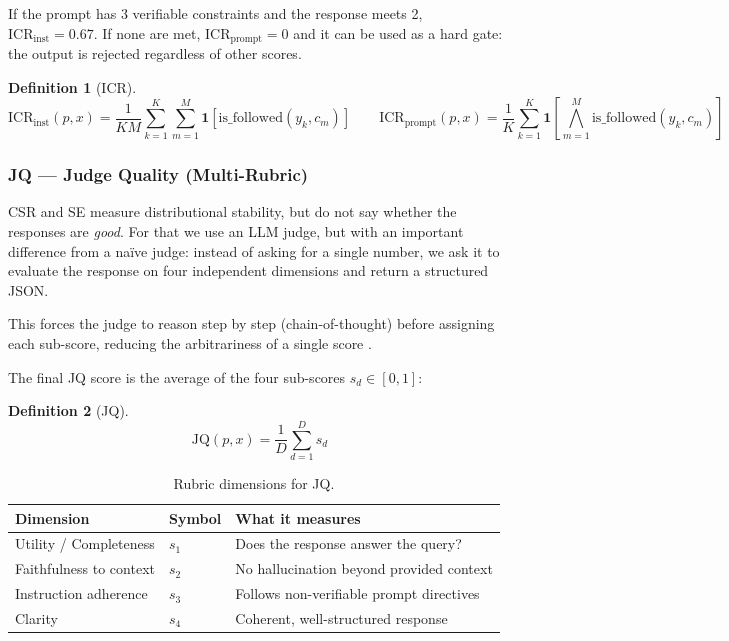 \documentclass[11pt,a4paper]{article}
\newtheorem{definition}{Definition}
\begin{document}
If the prompt has 3 verifiable constraints and the response meets 2, $\mathrm{ICR}_\mathrm{inst} = 0.67$. If none are met, $\mathrm{ICR}_\mathrm{prompt} = 0$ and it can be used as a hard gate: the output is rejected regardless of other scores.

\begin{definition}[ICR]
\[
\mathrm{ICR}_\mathrm{inst}(p, x) = \frac{1}{KM} \sum_{k=1}^{K} \sum_{m=1}^{M} \mathbf{1}\left[\mathrm{is\_followed}(y_k, c_m)\right]
\qquad
\mathrm{ICR}_\mathrm{prompt}(p, x) = \frac{1}{K} \sum_{k=1}^{K} \mathbf{1}\left[\bigwedge_{m=1}^{M} \mathrm{is\_followed}(y_k, c_m)\right]
\]
\end{definition}

\subsubsection{JQ — Judge Quality (Multi-Rubric)}

CSR and SE measure distributional stability, but do not say whether the responses are \textit{good}. For that we use an LLM judge, but with an important difference from a naïve judge: instead of asking for a single number, we ask it to evaluate the response on four independent dimensions and return a structured JSON.

This forces the judge to reason step by step (chain-of-thought) before assigning each sub-score, reducing the arbitrariness of a single score \citep{geval2023, unieval2022}.

The final JQ score is the average of the four sub-scores $s_d \in [0,1]$:

\begin{definition}[JQ]
\[
\mathrm{JQ}(p, x) = \frac{1}{D} \sum_{d=1}^{D} s_d
\]
\end{definition}

\begin{table}[h]
\centering
\caption{Rubric dimensions for JQ.}
\begin{tabular}{lll}
\toprule
Dimension & Symbol & What it measures \\
\midrule
Utility / Completeness & $s_1$ & Does the response answer the query? \\
Faithfulness to context & $s_2$ & No hallucination beyond provided context \\
Instruction adherence & $s_3$ & Follows non-verifiable prompt directives \\
Clarity & $s_4$ & Coherent, well-structured response \\
\bottomrule
\end{tabular}
\end{table}
\end{document}
